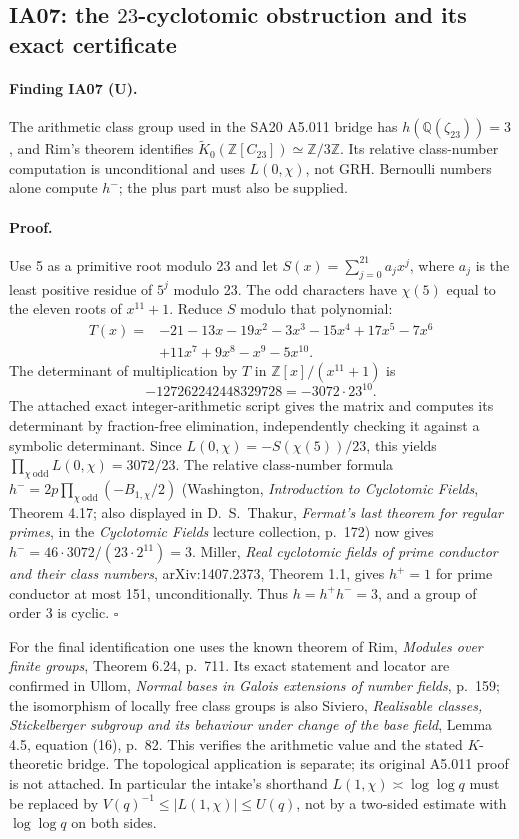 \documentclass[11pt,a4paper]{article}
\theoremstyle{definition}
\begin{document}
\subsection{IA07: the $23$-cyclotomic obstruction and its exact certificate}

\paragraph{Finding IA07 (U).}
The arithmetic class group used in the SA20 A5.011 bridge has
$h(\mathbb Q(\zeta_{23}))=3$, and Rim's theorem identifies
$\widetilde K_0(\mathbb Z[C_{23}])\simeq\mathbb Z/3\mathbb Z$.
Its relative class-number computation
is unconditional and uses $L(0,\chi)$, not GRH.  Bernoulli numbers
alone compute $h^-$; the plus part must also be supplied.

\paragraph{Proof.}
Use 5 as a primitive root modulo 23 and let
$S(x)=\sum_{j=0}^{21}a_jx^j$, where $a_j$ is the least positive
residue of $5^j$ modulo 23.  The odd characters have $\chi(5)$ equal
to the eleven roots of $x^{11}+1$.  Reduce $S$ modulo that polynomial:
\[
\begin{split}
 T(x)={}&-21-13x-19x^2-3x^3-15x^4+17x^5-7x^6\\
        &+11x^7+9x^8-x^9-5x^{10}.
\end{split}
\]
The determinant of multiplication by $T$ in
$\mathbb Z[x]/(x^{11}+1)$ is
\[
                    -127262242448329728=-3072\cdot23^{10}.
\]
The attached exact integer-arithmetic script gives the matrix and
computes its determinant by fraction-free elimination, independently
checking it against a symbolic determinant.  Since
$L(0,\chi)=-S(\chi(5))/23$, this yields
$\prod_{\chi\ {\mathrm{odd}}}L(0,\chi)=3072/23$.
The relative class-number formula
$h^-=2p\prod_{\chi\ {\mathrm{odd}}}(-B_{1,\chi}/2)$
(Washington, \emph{Introduction to Cyclotomic Fields}, Theorem 4.17;
also displayed in D.~S.~Thakur, \emph{Fermat's last theorem for regular
primes}, in the \emph{Cyclotomic Fields} lecture collection, p.~172)
now gives $h^-=46\cdot3072/(23\cdot2^{11})=3$.
Miller, \emph{Real cyclotomic fields of prime conductor and their
class numbers}, arXiv:1407.2373, Theorem 1.1, gives $h^+=1$ for
prime conductor at most 151, unconditionally.  Thus $h=h^+h^-=3$,
and a group of order 3 is cyclic. \hfill$\square$

For the final identification one uses the known theorem of
Rim, \emph{Modules over finite groups}, Theorem 6.24, p.~711.
Its exact statement and locator are confirmed in Ullom,
\emph{Normal bases in Galois extensions of number fields}, p.~159;
the isomorphism of locally free class groups is also Siviero,
\emph{Realisable classes, Stickelberger subgroup and its behaviour
under change of the base field}, Lemma 4.5, equation (16), p.~82.
This verifies the arithmetic value and the stated $K$-theoretic bridge.
The topological application is separate; its original A5.011 proof
is not attached.  In particular the intake's
shorthand $L(1,\chi)\asymp\log\log q$ must be replaced by
$V(q)^{-1}\leq|L(1,\chi)|\leq U(q)$, not by a two-sided estimate
with $\log\log q$ on both sides.
\end{document}
